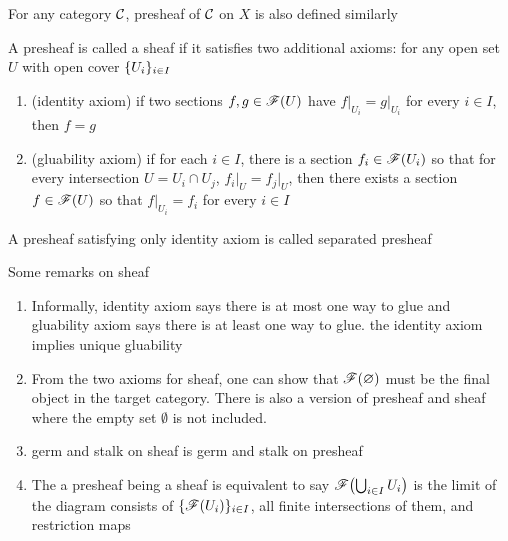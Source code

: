\begin{remark}
	For any category $\mathcal{C}$, presheaf of $\mathcal{C}$ on $X$ is also defined similarly
\end{remark}

\begin{definition}
	A presheaf is called a sheaf if it satisfies two additional axioms: for any open set $U$ with open cover $\{U_i\}_{i \in I}$
	\begin{enumerate}
		\item (identity axiom) if two sections $f, g \in \mathscr{F}(U)$ have $f\vert_{U_i} = g\vert_{U_i}$ for every $i \in I$, then $f = g$
		
		\item (gluability axiom) if for each $i \in I$, there is a section $f_i \in \mathscr{F}(U_i)$ so that for every intersection $U = U_i \cap U_j$, $f_i\vert_U = f_j\vert_U$, then there exists a section $f \in \mathscr{F}(U)$ so that $f\vert_{U_i} = f_i$ for every $i \in I$
	\end{enumerate}
	
	A presheaf satisfying only identity axiom is called separated presheaf
\end{definition}

\begin{remark}
	Some remarks on sheaf
	\begin{enumerate}
		\item Informally, identity axiom says there is at most one way to glue and gluability axiom says there is at least one way to glue. the identity axiom implies unique gluability
		
		\item From the two axioms for sheaf, one can show that $\mathscr{F}(\varnothing)$ must be the final object in the target category. There is also a version of presheaf and sheaf where the empty set $\emptyset$ is not included.
		
		\item germ and stalk on sheaf is germ and stalk on presheaf
		
		\item The a presheaf being a sheaf is equivalent to say $\ms{F}\tuple*{\bigcup_{i \in I} U_i}$ is the limit of the diagram consists of $\{\mathscr{F}(U_i)\}_{i \in I}$, all finite intersections of them, and restriction maps
		\begin{center}
		\end{center}
	\end{enumerate}
\end{remark}

